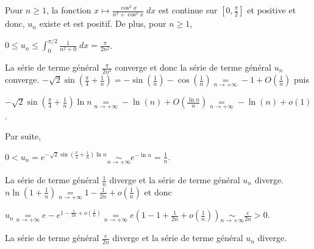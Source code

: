 {{Pour $n\geqslant1$, la fonction $x\mapsto\frac{\cos^2x}{n^2+\cos^2x}\;dx$ est continue sur $\left[0,\frac{\pi}{2}\right]$ et positive et donc, $u_n$ existe et est positif. De plus, pour $n\geqslant1$,

\begin{center}
$0\leqslant u_n\leqslant\int_{0}^{\pi/2}\frac{1}{n^2+0}\;dx=\frac{\pi}{2n^2}$.
\end{center}

La série de terme général $\frac{\pi}{2n^2}$ converge et donc la série de terme général $u_n$ converge.
$-\sqrt{2}\sin\left(\frac{\pi}{4}+\frac{1}{n}\right) =-\sin\left(\frac{1}{n}\right)-\cos\left(\frac{1}{n}\right)\underset{n\rightarrow+\infty}{=}-1+O\left(\frac{1}{n}\right)$ puis

\begin{center}
$-\sqrt{2}\sin\left(\frac{\pi}{4}+\frac{1}{n}\right)\ln n\underset{n\rightarrow+\infty}{=}-\ln(n)+O\left(\frac{\ln n}{n}\right)\underset{n\rightarrow+\infty}{=}-\ln(n)+o(1)$.
\end{center}

Par suite,

\begin{center}
$0< u_n=e^{-\sqrt{2}\sin\left(\frac{\pi}{4}+\frac{1}{n}\right)\ln n}\underset{n\rightarrow+\infty}{\sim}e^{-\ln n}=\frac{1}{n}$.
\end{center}

La série de terme général $\frac{1}{n}$ diverge et la série de terme général $u_n$ diverge.
$n\ln\left(1+\frac{1}{n}\right)\underset{n\rightarrow+\infty}{=}1-\frac{1}{2n}+o\left(\frac{1}{n}\right)$ et donc

\begin{center}
$u_n\underset{n\rightarrow+\infty}{=}e-e^{1-\frac{1}{2n}+o\left(\frac{1}{n}\right)}\underset{n\rightarrow+\infty}{=}e\left(1-1+\frac{1}{2n}+o\left(\frac{1}{n}\right)\right)\underset{n\rightarrow+\infty}{\sim}\frac{e}{2n}>0$.
\end{center}

La série de terme général $\frac{e}{2n}$ diverge et la série de terme général $u_n$ diverge.
}
}
